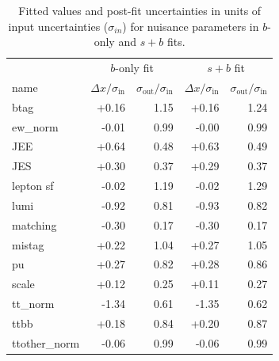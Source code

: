 \begin{table}[ht!]
\centering
\begin{tabular}{|l|r|r|r|r|} \hline 
&  \multicolumn{2}{c|}{$b$-only fit } & \multicolumn{2}{c|}{$s+b$ fit} \\ 
name  &  $\Delta x/\sigma_{\text{in}}$ & $\sigma_{\text{out}}/\sigma_{\text{in}}$ & $\Delta x/\sigma_{\text{in}}$ &$\sigma_{\text{out}}/\sigma_{\text{in}}$  \\  \hline
btag                        &   +0.16 &  1.15 &   +0.16 & 1.24  \\
ew\_norm               &    -0.01 &  0.99 &   -0.00  & 0.99  \\
JEE                           &    +0.64 &  0.48 &  +0.63 & 0.49  \\
JES                          &    +0.30 &  0.37 &  +0.29  & 0.37  \\
lepton sf                  &    -0.02  &  1.19 &  -0.02  & 1.29  \\
lumi                        &    -0.92  &  0.81 &  -0.93  & 0.82  \\
matching                &    -0.30  &  0.17 &   -0.30 & 0.17  \\
mistag                    &    +0.22  & 1.04 &  +0.27 & 1.05  \\
pu                           &    +0.27 &  0.82 &  +0.28 & 0.86  \\
scale                      &     +0.12 &  0.25 &  +0.11 & 0.27  \\
tt\_norm                 &     -1.34  &  0.61 &  -1.35  & 0.62 \\
ttbb                        &      +0.18 &  0.84 & +0.20 & 0.87  \\
ttother\_norm         &     -0.06   & 0.99 &  -0.06 & 0.99  \\
\hline
\end{tabular}
\caption{Fitted values and post-fit uncertainties in units of input uncertainties ($\sigma_{in}$) for nuisance parameters in $b$-only and $s+b$ fits.}
\label{tab:nuisBSB}
\end{table}



